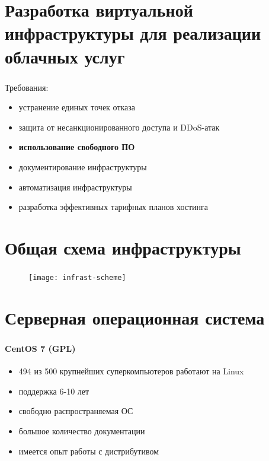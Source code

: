 
\frame[plain]{\titlepage} %


\section{Разработка виртуальной инфраструктуры для реализации облачных услуг}

\begin{frame}
\frametitle{\insertsection}
Требования:
\begin{itemize}
	\item устранение единых точек отказа
	\item защита от несанкционированного доступа и DDoS-атак
	\item \textbf{использование свободного ПО}
	\item документирование инфраструктуры
	\item автоматизация инфраструктуры
	\item разработка эффективных тарифных планов хостинга
\end{itemize}
\end{frame}


\section{Общая схема инфраструктуры}

\begin{frame}
\frametitle{\insertsection}
\begin{figure}[h]
	\center
	\texttt{[image: infrast-scheme]}
\end{figure}
\end{frame}


\section{Серверная операционная система}

\begin{frame}
\frametitle{\insertsection}
\framesubtitle{CentOS 7 (GPL)}
\begin{itemize}
	\item 494 из 500 крупнейших суперкомпьютеров работают на Linux
	\item поддержка 6-10 лет
	\item свободно распространяемая ОС
	\item большое количество документации
	\item имеется опыт работы с дистрибутивом
\end{itemize}
\end{frame}

